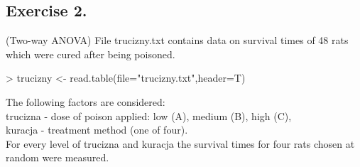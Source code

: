 \documentclass[a4paper]{article}
\begin{document}
\subsection{Exercise 2.} (Two-way ANOVA) File trucizny.txt  contains data on survival times of 48 rats which were cured after being
poisoned. 
\begin{Schunk}
\begin{Sinput}
> trucizny <- read.table(file="trucizny.txt",header=T)
\end{Sinput}
\end{Schunk}
The following factors are considered:\\
trucizna - dose of poison applied: low (A), medium (B), high (C),\\
kuracja - treatment method (one of four).\\
For every level of trucizna and kuracja the survival times for four rats chosen
at random were measured.
\end{document}
